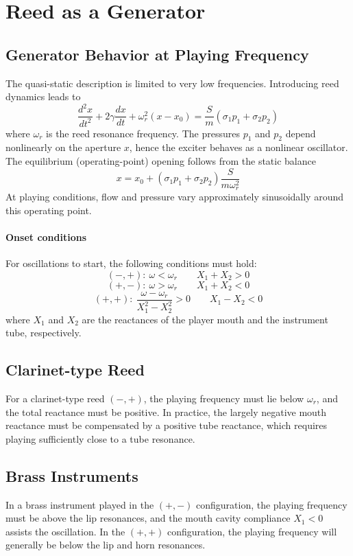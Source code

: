 \section{Reed as a Generator}

\subsection{Generator Behavior at Playing Frequency}

The quasi-static description is limited to very low frequencies. Introducing reed dynamics leads to
\[
\frac{d^2 x}{dt^2} + 2\gamma \frac{dx}{dt} + \omega_r^2 (x - x_0)
= \frac{S}{m}(\sigma_1 p_1 + \sigma_2 p_2)
\]
where \( \omega_r \) is the reed resonance frequency. The pressures \( p_1 \) and \( p_2 \) depend nonlinearly on the aperture \( x \), hence the exciter behaves as a nonlinear oscillator. The equilibrium (operating-point) opening follows from the static balance
\[
x = x_0 + (\sigma_1 p_1 + \sigma_2 p_2)\frac{S}{m\omega_r^2}
\]
At playing conditions, flow and pressure vary approximately sinusoidally around this operating point. 

\paragraph{Onset conditions} For oscillations to start, the following conditions must hold:
\[
(-,+): \ \omega < \omega_r
\qquad
X_1 + X_2 > 0
\]
\[
(+,-): \ \omega > \omega_r
\qquad
X_1 + X_2 < 0
\]
\[
(+,+): \ \frac{\omega - \omega_r}{X_1^2 - X_2^2} > 0
\qquad
X_1 - X_2 < 0
\]
where \( X_1 \) and \( X_2 \) are the reactances of the player mouth and the instrument tube, respectively. 

\subsection{Clarinet-type Reed}

For a clarinet-type reed \( (-,+) \), the playing frequency must lie below \( \omega_r \), and the total reactance must be positive. In practice, the largely negative mouth reactance must be compensated by a positive tube reactance, which requires playing sufficiently close to a tube resonance.

\subsection{Brass Instruments}

In a brass instrument played in the \( (+,-) \) configuration, the playing frequency must be above the lip resonances, and the mouth cavity compliance \( X_1 < 0 \) assists the oscillation. In the \( (+,+) \) configuration, the playing frequency will generally be below the lip and horn resonances. 

